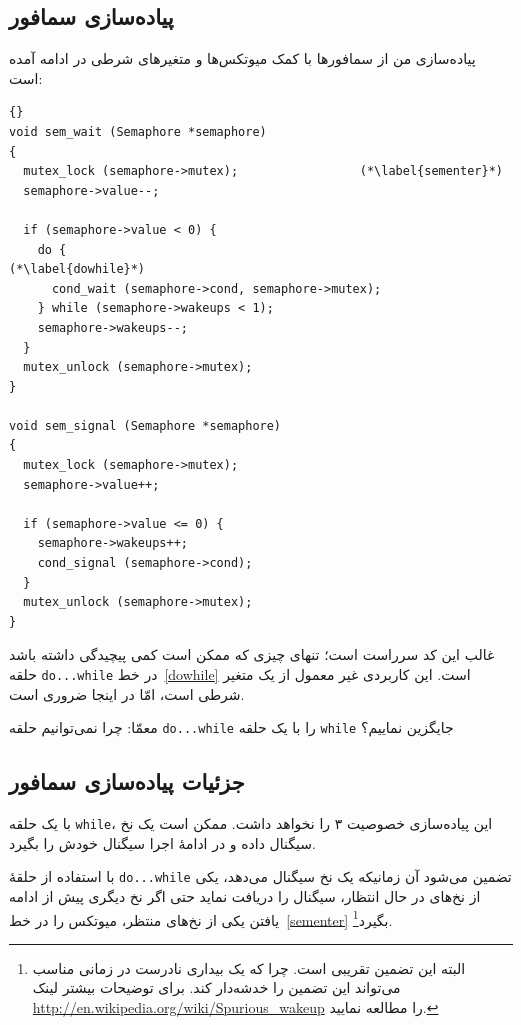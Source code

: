 \documentclass{book}
\newcommand{\clearemptydoublepage}{}%
\begin{document}
\clearemptydoublepage
\subsection{پیاده‌سازی سمافور}

    پیاده‌سازی من از سمافورها با کمک میوتکس‌ها و متغیرهای شرطی  در ادامه آمده است:

\begin{latin}
\begin{lstlisting}[title={}]{}
void sem_wait (Semaphore *semaphore)
{
  mutex_lock (semaphore->mutex);                 (*\label{sementer}*)
  semaphore->value--;

  if (semaphore->value < 0) {
    do {                                                (*\label{dowhile}*)
      cond_wait (semaphore->cond, semaphore->mutex);
    } while (semaphore->wakeups < 1);
    semaphore->wakeups--;
  }
  mutex_unlock (semaphore->mutex);
}

void sem_signal (Semaphore *semaphore)
{
  mutex_lock (semaphore->mutex);
  semaphore->value++;

  if (semaphore->value <= 0) {
    semaphore->wakeups++;
    cond_signal (semaphore->cond);
  }
  mutex_unlock (semaphore->mutex);
}
\end{lstlisting}
\end{latin}

    غالب این کد سرراست است؛ تنهای چیزی که ممکن است کمی پیچیدگی داشته باشد حلقه {\tt do...while} در خط~\ref{dowhile} است. 
    این کاربردی غیر معمول از یک متغیر شرطی است، امّا در اینجا ضروری است. 

    معمّا: چرا نمی‌توانیم حلقه {\tt do...while} را با یک حلقه {\tt while}  جایگزین نماییم؟

\clearemptydoublepage
\subsection{جزئیات پیاده‌سازی سمافور}

    با یک حلقه {\tt while}، این پیاده‌سازی خصوصیت ۳ را نخواهد داشت. ممکن است یک نخ سیگنال داده و در ادامهٔ اجرا سیگنال خودش 
    را بگیرد. 

    با استفاده از حلقهٔ {\tt do...while} تضمین می‌شود آن زمانیکه یک نخ سیگنال می‌دهد، یکی از نخ‌های در حال انتظار، سیگنال را دریافت نماید 
    حتی اگر نخ دیگری  پیش از ادامه یافتن یکی از نخ‌های منتظر، میوتکس را در خط~\ref{sementer} بگیرد\footnote{
    البته این تضمین تقریبی است. چرا که یک بیداری نادرست در زمانی مناسب می‌تواند این تضمین را خدشه‌دار کند. برای توضیحات بیشتر لینک 
    \url{http://en.wikipedia.org/wiki/Spurious_wakeup} را مطالعه نمایید. 
    }.
\end{document}
